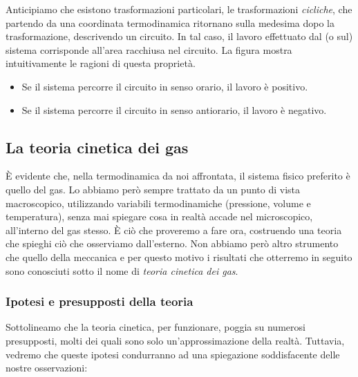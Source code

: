 Anticipiamo che esistono trasformazioni particolari, le trasformazioni
\textit{cicliche}, che partendo da una coordinata termodinamica
ritornano sulla medesima dopo la trasformazione, descrivendo un circuito.
In tal caso, il lavoro effettuato dal (o sul) sistema corrisponde
all'area racchiusa nel circuito. La figura mostra intuitivamente le
ragioni di questa proprietà.

\begin{itemize}
    \item Se il sistema percorre il circuito in senso orario, il
    lavoro è positivo.

    \item Se il sistema percorre il circuito in senso antiorario,
    il lavoro è negativo.
\end{itemize}





\subsection{La teoria cinetica dei gas}
È evidente che, nella termodinamica da noi affrontata, il sistema
fisico preferito è quello del gas. Lo abbiamo però sempre trattato
da un punto di vista macroscopico, utilizzando variabili termodinamiche
(pressione, volume e temperatura), senza mai spiegare cosa in realtà
accade nel microscopico, all'interno del gas stesso. È ciò che proveremo
a fare ora, costruendo una teoria che spieghi ciò che osserviamo
dall'esterno. Non abbiamo però altro strumento che quello della meccanica
e per questo motivo i risultati che otterremo in seguito sono
conosciuti sotto il nome di \textit{teoria cinetica dei gas}.

\subsubsection*{Ipotesi e presupposti della teoria}
Sottolineamo che la teoria cinetica, per funzionare, poggia su numerosi
presupposti, molti dei quali sono solo un'approssimazione della realtà.
Tuttavia, vedremo che queste ipotesi condurranno ad una spiegazione
soddisfacente delle nostre osservazioni:

